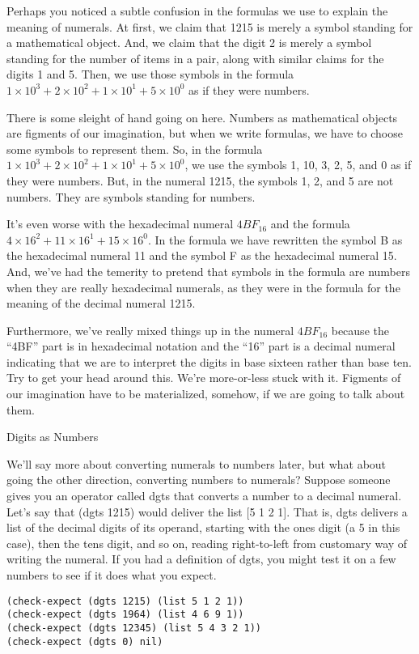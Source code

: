 \begin{aside}
Perhaps you noticed a subtle confusion in the formulas we use
to explain the meaning of numerals. At first, we claim that
1215 is merely a symbol standing for a mathematical object.
And, we claim that the digit 2 is merely a symbol standing
for the number of items in a pair, along with similar
claims for the digits 1 and 5.
Then, we use those symbols in the formula
$1 \times 10^3 + 2 \times 10^2 + 1 \times 10^1 + 5 \times 10^0$
as if they were numbers.

There is some sleight of hand going on here.
Numbers as mathematical objects are figments of our imagination,
but when we write formulas, we have to choose some symbols to
represent them.
So, in the formula $1 \times 10^3 + 2 \times 10^2 + 1 \times 10^1 + 5 \times 10^0$,
we use the symbols 1, 10, 3, 2, 5, and 0 as if they were numbers.
But, in the numeral 1215, the symbols 1, 2, and 5 are not numbers.
They are symbols standing for numbers.

It's even worse with the hexadecimal numeral $4BF_{16}$
and the formula $4 \times 16^2 + 11 \times 16^1 + 15 \times 16^0$.
In the formula we have rewritten the symbol B as the hexadecimal numeral 11
and the symbol F as the hexadecimal numeral 15.
And, we've had the temerity to pretend that symbols
in the formula are numbers when they are really hexadecimal numerals,
as they were in the formula for the meaning of the decimal numeral 1215.

Furthermore, we've really mixed things up in the numeral
$4BF_{16}$ because the ``4BF'' part is in hexadecimal notation
and the ``16'' part is a decimal numeral indicating that we are
to interpret the digits in base sixteen rather than base ten.
Try to get your head around this.
We're more-or-less stuck with it. Figments of our imagination have
to be materialized, somehow, if we are going to talk about them.
\caption{Digits as Numbers}
\label{aside-digits-as-numbers}
\end{aside}

We'll say more about converting numerals to numbers later,
but what about going the other direction, converting
numbers to numerals?
Suppose someone gives you an operator called \textsf{dgts} that
converts a number to a decimal numeral.
Let's say that \textsf{(dgts 1215)} would deliver the list \textsf{[5 1 2 1]}.
That is, \textsf{dgts} delivers a list of the decimal digits
of its operand,
starting with the ones digit (a 5 in this case),
then the tens digit, and so on, reading right-to-left from
customary way of writing the numeral.
If you had a definition of \textsf{dgts},
you might test it on a few numbers to see if it does what you expect.
\begin{Verbatim}
(check-expect (dgts 1215) (list 5 1 2 1))
(check-expect (dgts 1964) (list 4 6 9 1))
(check-expect (dgts 12345) (list 5 4 3 2 1))
(check-expect (dgts 0) nil)
\end{Verbatim}

